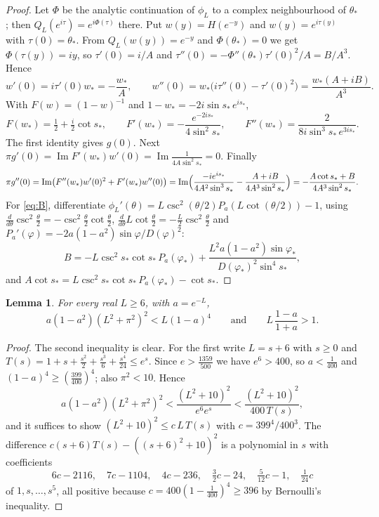 \documentclass[11pt]{amsart}
\newtheorem{lemma}[theorem]{Lemma}
\theoremstyle{remark}
\begin{document}
\begin{proof}
Let $\Phi$ be the analytic continuation of $\phi_L$ to a complex neighbourhood of $\theta_*$; then $Q_L(e^{i\tau})=e^{i\Phi(\tau)}$ there. Put $w(y)=H(e^{-y})$ and $w(y)=e^{i\tau(y)}$ with $\tau(0)=\theta_*$. From $Q_L(w(y))=e^{-y}$ and $\Phi(\theta_*)=0$ we get $\Phi(\tau(y))=iy$, so $\tau'(0)=i/A$ and $\tau''(0)=-\Phi''(\theta_*)\tau'(0)^2/A=B/A^3$. Hence
\[
w'(0)=i\tau'(0)w_*=-\frac{w_*}A,\qquad w''(0)=w_*\bigl(i\tau''(0)-\tau'(0)^2\bigr)=\frac{w_*(A+iB)}{A^3}.
\]
With $F(w)=(1-w)^{-1}$ and $1-w_*=-2i\sin s_*\,e^{is_*}$,
\[
F(w_*)=\tfrac12+\tfrac i2\cot s_*,\qquad F'(w_*)=-\frac{e^{-2is_*}}{4\sin^2s_*},\qquad F''(w_*)=\frac{2}{8i\sin^3s_*\,e^{3is_*}} .
\]
The first identity gives $g(0)$. Next $\pi g'(0)=\operatorname{Im}F'(w_*)w'(0)=\operatorname{Im}\frac{1}{4A\sin^2s_*}=0$. Finally
\[
\pi g''(0)=\operatorname{Im}\bigl(F''(w_*)w'(0)^2+F'(w_*)w''(0)\bigr)=\operatorname{Im}\Bigl(\frac{-ie^{is_*}}{4A^2\sin^3s_*}-\frac{A+iB}{4A^3\sin^2s_*}\Bigr)=-\frac{A\cot s_*+B}{4A^3\sin^2s_*}.
\]
For \eqref{eq:B}, differentiate $\phi_L'(\theta)=L\csc^2(\theta/2)P_a(L\cot(\theta/2))-1$, using $\frac{d}{d\theta}\csc^2\frac\theta2=-\csc^2\frac\theta2\cot\frac\theta2$, $\frac{d}{d\theta}L\cot\frac\theta2=-\frac L2\csc^2\frac\theta2$ and $P_a'(\varphi)=-2a(1-a^2)\sin\varphi/D(\varphi)^2$:
\[
B=-L\csc^2s_*\cot s_*\,P_a(\varphi_*)+\frac{L^2a(1-a^2)\sin\varphi_*}{D(\varphi_*)^2\sin^4s_*},
\]
and $A\cot s_*=L\csc^2s_*\cot s_*\,P_a(\varphi_*)-\cot s_*$.
\end{proof}

\begin{lemma}\label{lem:CL}
For every real $L\ge6$, with $a=e^{-L}$,
\begin{equation}\label{eq:CL}
a(1-a^2)(L^2+\pi^2)^2<L(1-a)^4\qquad\text{and}\qquad L\,\frac{1-a}{1+a}>1 .
\end{equation}
\end{lemma}

\begin{proof}
The second inequality is clear. For the first write $L=s+6$ with $s\ge0$ and $T(s)=1+s+\frac{s^2}2+\frac{s^3}6+\frac{s^4}{24}\le e^s$. Since $e>\frac{1359}{500}$ we have $e^6>400$, so $a<\frac1{400}$ and $(1-a)^4\ge(\frac{399}{400})^4$; also $\pi^2<10$. Hence
\[
a(1-a^2)(L^2+\pi^2)^2<\frac{(L^2+10)^2}{e^6e^s}<\frac{(L^2+10)^2}{400\,T(s)},
\]
and it suffices to show $(L^2+10)^2\le c\,L\,T(s)$ with $c=399^4/400^3$. The difference $c(s+6)T(s)-((s+6)^2+10)^2$ is a polynomial in $s$ with coefficients
\[
6c-2116,\quad 7c-1104,\quad 4c-236,\quad \tfrac32c-24,\quad \tfrac5{12}c-1,\quad \tfrac1{24}c
\]
of $1,s,\dots,s^5$, all positive because $c=400(1-\frac1{400})^4\ge396$ by Bernoulli's inequality.
\end{proof}
\end{document}

